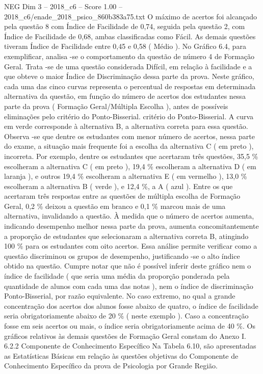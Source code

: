 \begin{textsample}{NEG Dim 3 – 2018\_c6 – Score 1.00 – 2018\_c6/enade\_2018\_psico\_860b383a75.txt}
O máximo de acertos foi alcançado pela questão 8 com Índice de Facilidade de 0,74, seguida pela questão 2, com Índice de Facilidade de 0,68, ambas classificadas como Fácil.
As demais questões tiveram Índice de Facilidade entre 0,45 e 0,58 ( Médio ).
No Gráfico 6.4, para exemplificar, analisa -se o comportamento da questão de número 4 de Formação Geral.
Trata -se de uma questão considerada Difícil, em relação à facilidade e a que obteve o maior Índice de Discriminação dessa parte da prova.
Neste gráfico, cada uma das cinco curvas representa o percentual de respostas em determinada alternativa da questão, em função do número de acertos dos estudantes nessa parte da prova ( Formação Geral/Múltipla Escolha ), antes de possíveis eliminações pelo critério do Ponto-Bisserial. critério do Ponto-Bisserial.
A curva em verde corresponde à alternativa B, a alternativa correta para essa questão.
Observa -se que dentre os estudantes com menor número de acertos, nessa parte do exame, a situação mais frequente foi a escolha da alternativa C ( em preto ), incorreta.
Por exemplo, dentre os estudantes que acertaram três questões, 35,5 \% escolheram a alternativa C ( em preto ), 19,4 \% escolheram a alternativa D ( em laranja ), e outros 19,4 \% escolheram a alternativa E ( em vermelho ), 13,0 \% escolheram a alternativa B ( verde ), e 12,4 \%, a A ( azul ).
Entre os que acertaram três respostas entre as questões de múltipla escolha de Formação Geral, 0,2 \% deixou a questão em branco e 0,1 \% marcou mais de uma alternativa, invalidando a questão.
À medida que o número de acertos aumenta, indicando desempenho melhor nessa parte da prova, aumenta concomitantemente a proporção de estudantes que selecionaram a alternativa correta B, atingindo 100 \% para os estudantes com oito acertos.
Essa análise permite verificar como a questão discriminou os grupos de desempenho, justificando -se o alto índice obtido na questão.
Cumpre notar que não é possível inferir deste gráfico nem o índice de facilidade ( que seria uma média da proporção ponderada pela quantidade de alunos com cada uma das notas ), nem o índice de discriminação Ponto-Bisserial, por razão equivalente.
No caso extremo, no qual a grande concentração dos acertos dos alunos fosse abaixo de quatro, o índice de facilidade seria obrigatoriamente abaixo de 20 \% ( neste exemplo ).
Caso a concentração fosse em seis acertos ou mais, o índice seria obrigatoriamente acima de 40 \%.
Os gráficos relativos às demais questões de Formação Geral constam do Anexo I. 6.2.2 Componente de Conhecimento Específico Na Tabela 6.10, são apresentadas as Estatísticas Básicas em relação às questões objetivas do Componente de Conhecimento Específico da prova de Psicologia por Grande Região.

\end{textsample}
